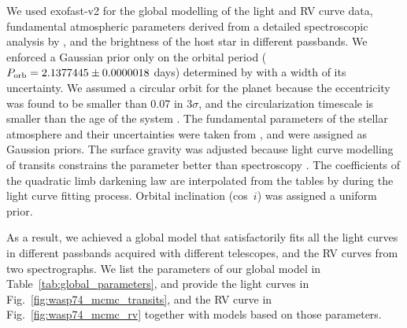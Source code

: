 \documentclass[a4paper,fleqn,usenatbib]{mnras}
\begin{document}
We used {\sc exofast}-v2 \citep{2017ascl.soft10003E, 2019arXiv190709480E} for the global modelling of the light and RV curve data, fundamental atmospheric parameters derived from a detailed spectroscopic analysis by \citet{2018A&A...620A..58S},  and the brightness of the host star in different passbands. We enforced a Gaussian prior only on the orbital period ($P_{\rm orb} = 2.1377445 \pm 0.0000018$ days) determined by \cite{2019MNRAS.485.5168M} with a width of its uncertainty. We assumed a circular orbit for the planet because the eccentricity was found to be smaller than 0.07 in 3$\sigma$, and the circularization timescale is smaller than the age of the system \citep{2015AJ....150...18H}. The fundamental parameters of the stellar atmosphere and their uncertainties were taken from \citep{2018A&A...620A..58S}, and were assigned as Gaussion priors. The surface gravity was adjusted because light curve modelling of transits constrains the parameter better than spectroscopy \citep{2007MNRAS.379L..11S}. The coefficients of the quadratic limb darkening law are interpolated from the tables by \cite{2011A&A...529A..75C} during the light curve fitting process. Orbital inclination (cos~$i$) was assigned a uniform prior.

As a result, we achieved a global model that satisfactorily fits all the light curves in different passbands acquired with different telescopes, and the RV curves from two spectrographs. We list the parameters of our global model in Table~\ref{tab:global_parameters}, and provide the light curves in Fig.~\ref{fig:wasp74_mcmc_transits}, and the RV curve in Fig.~\ref{fig:wasp74_mcmc_rv} together with models based on those parameters.
\end{document}
